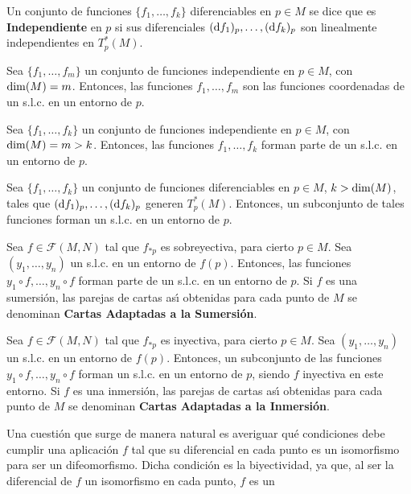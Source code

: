\documentclass[cursovd_portada.tex]{subfiles}
\begin{document}
\begin{defi}
Un conjunto de funciones $\{f_1,\dots ,f_k\}$ diferenciables en
$p\in M$ se dice que es {\bf Independiente} en $p$ si sus
diferenciales $({\rm d} f_1)_p,\dots, ({\rm d} f_k)_p$ son linealmente
independientes en $T_p^*(M)$.
\end{defi}
\begin{coro}
Sea $\{f_1,\dots ,f_m\}$ un conjunto de funciones independiente en
$p\in M$, con ${\rm dim}(M)=m$. Entonces, las funciones $f_1,\dots
,f_m$ son las funciones coordenadas de un s.l.c. en un entorno de
$p$.
\end{coro}
\begin{coro}
Sea $\{f_1,\dots ,f_k\}$ un conjunto de funciones independiente en
$p\in M$, con ${\rm dim}(M)=m>k$. Entonces, las funciones
$f_1,\dots ,f_k$ forman parte de un s.l.c. en un entorno de $p$.
\end{coro}
\begin{coro}
Sea $\{f_1,\dots ,f_k\}$ un conjunto de funciones diferenciables
en $p\in M$, $k>{\rm dim}(M)$, tales que $({\rm d} f_1)_p,\dots
,({\rm d} f_k)_p$ generen $T_p^*(M)$. Entonces, un subconjunto de
tales funciones forman un s.l.c. en un entorno de $p$.
\end{coro}
\begin{coro}
Sea $f\in\mathcal{F}(M,N)$ tal que $f_{*p}$ es sobreyectiva, para
cierto $p\in M$. Sea $(y_1,\dots ,y_n)$ un s.l.c. en un entorno de
$f(p)$. Entonces, las funciones \ $y_1\circ f,\dots ,y_n\circ f$
forman parte de un s.l.c. en un entorno de $p$. Si $f$ es una
sumersi\'{o}n, las parejas de cartas as\'{\i} obtenidas para cada
punto de $M$ se denominan {\bf Cartas Adaptadas a la
Sumersi\'{o}n}.
\end{coro}
\begin{coro}
Sea $f\in\mathcal{F}(M,N)$ tal que $f_{*p}$ es inyectiva, para
cierto $p\in M$. Sea $(y_1,\dots ,y_n)$ un s.l.c. en un entorno de
$f(p)$. Entonces, un subconjunto de las funciones $y_1\circ
f,\dots ,y_n\circ f$ forman un s.l.c. en un entorno de $p$, siendo
$f$ inyectiva en este entorno. Si $f$ es una inmersi\'{o}n, las
parejas de cartas as\'{\i} obtenidas para cada punto de $M$ se
denominan {\bf Cartas Adaptadas a la Inmersi\'{o}n}.
\end{coro}
Una cuesti\'{o}n que surge de manera natural es averiguar qu\'{e}
condiciones debe cumplir una aplicaci\'{o}n $f$ tal que su
diferencial en cada punto es un isomorfismo para ser un
difeomorfismo. Dicha condici\'{o}n es la biyectividad, ya que, al
ser la diferencial de $f$ un isomorfismo en cada punto, $f$ es un
\end{document}
